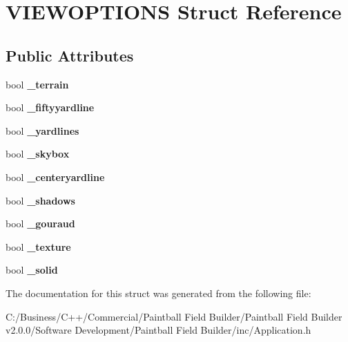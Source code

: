 \hypertarget{struct_v_i_e_w_o_p_t_i_o_n_s}{
\section{VIEWOPTIONS Struct Reference}
\label{struct_v_i_e_w_o_p_t_i_o_n_s}
}
\subsection*{Public Attributes}
\begin{DoxyCompactItemize}
\item 
\hypertarget{struct_v_i_e_w_o_p_t_i_o_n_s_a5ea5106e812ca94d700f879fce4f7d71}{
bool {\bfseries \_\-terrain}}
\label{struct_v_i_e_w_o_p_t_i_o_n_s_a5ea5106e812ca94d700f879fce4f7d71}

\item 
\hypertarget{struct_v_i_e_w_o_p_t_i_o_n_s_a179be2229eb8ca5ad61c0341ab95ad42}{
bool {\bfseries \_\-fiftyyardline}}
\label{struct_v_i_e_w_o_p_t_i_o_n_s_a179be2229eb8ca5ad61c0341ab95ad42}

\item 
\hypertarget{struct_v_i_e_w_o_p_t_i_o_n_s_a4d31f585c18828e978c920ded6dbec5d}{
bool {\bfseries \_\-yardlines}}
\label{struct_v_i_e_w_o_p_t_i_o_n_s_a4d31f585c18828e978c920ded6dbec5d}

\item 
\hypertarget{struct_v_i_e_w_o_p_t_i_o_n_s_afef4b1c018fbf7da225ea7f82c124d38}{
bool {\bfseries \_\-skybox}}
\label{struct_v_i_e_w_o_p_t_i_o_n_s_afef4b1c018fbf7da225ea7f82c124d38}

\item 
\hypertarget{struct_v_i_e_w_o_p_t_i_o_n_s_a361b9ba093428f79bc61bf2e2166592f}{
bool {\bfseries \_\-centeryardline}}
\label{struct_v_i_e_w_o_p_t_i_o_n_s_a361b9ba093428f79bc61bf2e2166592f}

\item 
\hypertarget{struct_v_i_e_w_o_p_t_i_o_n_s_a30292dc7a7264d7f600d00efb5a2d8e4}{
bool {\bfseries \_\-shadows}}
\label{struct_v_i_e_w_o_p_t_i_o_n_s_a30292dc7a7264d7f600d00efb5a2d8e4}

\item 
\hypertarget{struct_v_i_e_w_o_p_t_i_o_n_s_a9d371009530987f9a95f048a138471cc}{
bool {\bfseries \_\-gouraud}}
\label{struct_v_i_e_w_o_p_t_i_o_n_s_a9d371009530987f9a95f048a138471cc}

\item 
\hypertarget{struct_v_i_e_w_o_p_t_i_o_n_s_a1b02c4f16e50a96f5bdb6f0953e742e7}{
bool {\bfseries \_\-texture}}
\label{struct_v_i_e_w_o_p_t_i_o_n_s_a1b02c4f16e50a96f5bdb6f0953e742e7}

\item 
\hypertarget{struct_v_i_e_w_o_p_t_i_o_n_s_a73247259d03e7c49554deb9315f70d9b}{
bool {\bfseries \_\-solid}}
\label{struct_v_i_e_w_o_p_t_i_o_n_s_a73247259d03e7c49554deb9315f70d9b}

\end{DoxyCompactItemize}


The documentation for this struct was generated from the following file:\begin{DoxyCompactItemize}
\item 
C:/Business/C++/Commercial/Paintball Field Builder/Paintball Field Builder v2.0.0/Software Development/Paintball Field Builder/inc/Application.h\end{DoxyCompactItemize}
